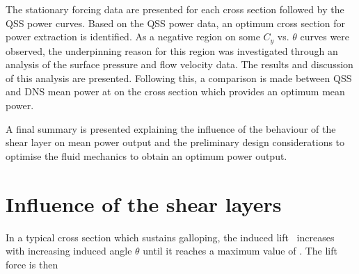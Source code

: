 The stationary forcing data are presented for each cross section followed by the QSS power curves. Based on the QSS power data, an optimum cross section for power extraction is identified. As a negative region on some $C_y$ vs. $\theta$ curves were observed, the underpinning reason for this region was investigated through an analysis of the surface pressure and flow velocity data. The results and discussion of this analysis are presented. Following this, a comparison is made between QSS and DNS mean power at on the cross section which provides an optimum mean power.       

A final summary is presented explaining the influence of the behaviour of the shear layer on mean power output and the preliminary design considerations to optimise the fluid mechanics to obtain an optimum power output. 

\section{Influence of the shear layers}

In a typical cross section which sustains galloping, the induced lift \cy\ increases with increasing induced angle $\theta$ until it reaches a maximum value of \cy. The lift force is then  



